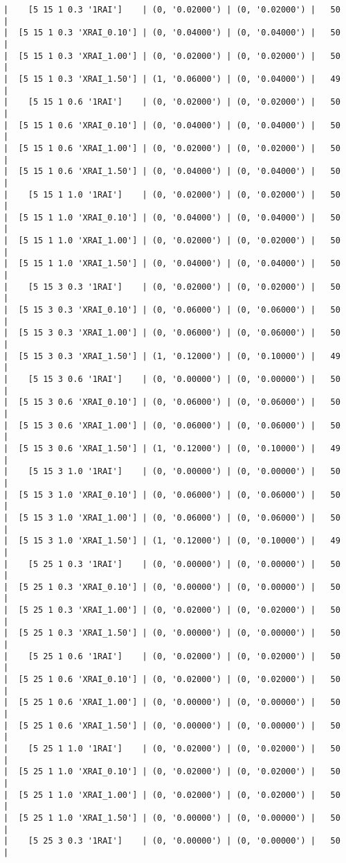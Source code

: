 \documentclass{article}
\begin{document}
\begin{verbatim}
|    [5 15 1 0.3 '1RAI']    | (0, '0.02000') | (0, '0.02000') |   50  |
|  [5 15 1 0.3 'XRAI_0.10'] | (0, '0.04000') | (0, '0.04000') |   50  |
|  [5 15 1 0.3 'XRAI_1.00'] | (0, '0.02000') | (0, '0.02000') |   50  |
|  [5 15 1 0.3 'XRAI_1.50'] | (1, '0.06000') | (0, '0.04000') |   49  |
|    [5 15 1 0.6 '1RAI']    | (0, '0.02000') | (0, '0.02000') |   50  |
|  [5 15 1 0.6 'XRAI_0.10'] | (0, '0.04000') | (0, '0.04000') |   50  |
|  [5 15 1 0.6 'XRAI_1.00'] | (0, '0.02000') | (0, '0.02000') |   50  |
|  [5 15 1 0.6 'XRAI_1.50'] | (0, '0.04000') | (0, '0.04000') |   50  |
|    [5 15 1 1.0 '1RAI']    | (0, '0.02000') | (0, '0.02000') |   50  |
|  [5 15 1 1.0 'XRAI_0.10'] | (0, '0.04000') | (0, '0.04000') |   50  |
|  [5 15 1 1.0 'XRAI_1.00'] | (0, '0.02000') | (0, '0.02000') |   50  |
|  [5 15 1 1.0 'XRAI_1.50'] | (0, '0.04000') | (0, '0.04000') |   50  |
|    [5 15 3 0.3 '1RAI']    | (0, '0.02000') | (0, '0.02000') |   50  |
|  [5 15 3 0.3 'XRAI_0.10'] | (0, '0.06000') | (0, '0.06000') |   50  |
|  [5 15 3 0.3 'XRAI_1.00'] | (0, '0.06000') | (0, '0.06000') |   50  |
|  [5 15 3 0.3 'XRAI_1.50'] | (1, '0.12000') | (0, '0.10000') |   49  |
|    [5 15 3 0.6 '1RAI']    | (0, '0.00000') | (0, '0.00000') |   50  |
|  [5 15 3 0.6 'XRAI_0.10'] | (0, '0.06000') | (0, '0.06000') |   50  |
|  [5 15 3 0.6 'XRAI_1.00'] | (0, '0.06000') | (0, '0.06000') |   50  |
|  [5 15 3 0.6 'XRAI_1.50'] | (1, '0.12000') | (0, '0.10000') |   49  |
|    [5 15 3 1.0 '1RAI']    | (0, '0.00000') | (0, '0.00000') |   50  |
|  [5 15 3 1.0 'XRAI_0.10'] | (0, '0.06000') | (0, '0.06000') |   50  |
|  [5 15 3 1.0 'XRAI_1.00'] | (0, '0.06000') | (0, '0.06000') |   50  |
|  [5 15 3 1.0 'XRAI_1.50'] | (1, '0.12000') | (0, '0.10000') |   49  |
|    [5 25 1 0.3 '1RAI']    | (0, '0.00000') | (0, '0.00000') |   50  |
|  [5 25 1 0.3 'XRAI_0.10'] | (0, '0.00000') | (0, '0.00000') |   50  |
|  [5 25 1 0.3 'XRAI_1.00'] | (0, '0.02000') | (0, '0.02000') |   50  |
|  [5 25 1 0.3 'XRAI_1.50'] | (0, '0.00000') | (0, '0.00000') |   50  |
|    [5 25 1 0.6 '1RAI']    | (0, '0.02000') | (0, '0.02000') |   50  |
|  [5 25 1 0.6 'XRAI_0.10'] | (0, '0.02000') | (0, '0.02000') |   50  |
|  [5 25 1 0.6 'XRAI_1.00'] | (0, '0.00000') | (0, '0.00000') |   50  |
|  [5 25 1 0.6 'XRAI_1.50'] | (0, '0.00000') | (0, '0.00000') |   50  |
|    [5 25 1 1.0 '1RAI']    | (0, '0.02000') | (0, '0.02000') |   50  |
|  [5 25 1 1.0 'XRAI_0.10'] | (0, '0.02000') | (0, '0.02000') |   50  |
|  [5 25 1 1.0 'XRAI_1.00'] | (0, '0.02000') | (0, '0.02000') |   50  |
|  [5 25 1 1.0 'XRAI_1.50'] | (0, '0.00000') | (0, '0.00000') |   50  |
|    [5 25 3 0.3 '1RAI']    | (0, '0.00000') | (0, '0.00000') |   50  |

\end{verbatim}
\end{document}
